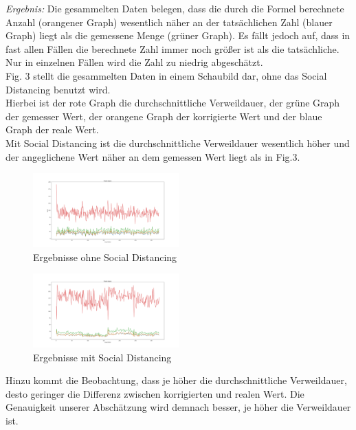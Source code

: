 \documentclass[conference]{IEEEtran}
\begin{document}
\textit{Ergebnis:}
Die gesammelten Daten belegen, dass die durch die Formel berechnete Anzahl (orangener Graph) wesentlich näher an der tatsächlichen Zahl (blauer Graph) liegt als die gemessene Menge (grüner Graph). Es fällt jedoch auf, dass in fast allen Fällen die berechnete Zahl immer noch größer ist als die tatsächliche. Nur in einzelnen Fällen wird die Zahl zu niedrig abgeschätzt.\\
Fig. 3 stellt die gesammelten Daten in einem Schaubild dar, ohne das Social Distancing benutzt wird.\\
Hierbei ist der rote Graph die durchschnittliche Verweildauer, der grüne Graph der gemesser Wert, der orangene Graph der korrigierte Wert und der blaue Graph der reale Wert.\\
Mit Social Distancing ist die durchschnittliche Verweildauer wesentlich höher und der angeglichene Wert näher an dem gemessen Wert liegt als in Fig.3.

\begin{figure}[h]
	\centering
	\includegraphics[width=0.5\textwidth]{"Mast_Data_Plotted_old"}
	\caption{Ergebnisse ohne Social Distancing}
\end{figure}

\begin{figure}[h]
	\centering
	\includegraphics[width=0.5\textwidth]{"Mast_Data_Plotted_Social_Distancing_old"}
	\caption{Ergebnisse mit Social Distancing}
\end{figure}

Hinzu kommt die Beobachtung, dass je höher die durchschnittliche Verweildauer, desto geringer die Differenz zwischen korrigierten und realen Wert. Die Genauigkeit unserer Abschätzung wird demnach besser, je höher die Verweildauer ist.\\
\end{document}

